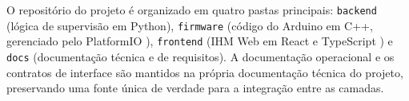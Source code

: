 O reposit\'orio do projeto \'e organizado em quatro pastas principais:
\texttt{backend} (l\'ogica de supervis\~ao em Python), \texttt{firmware}
(c\'odigo do Arduino em C++, gerenciado pelo PlatformIO \cite{platformio}),
\texttt{frontend} (IHM Web em React e TypeScript \cite{react}) e \texttt{docs}
(documenta\c{c}\~ao t\'ecnica e de requisitos). A documenta\c{c}\~ao operacional
e os contratos de interface s\~ao mantidos na pr\'opria documenta\c{c}\~ao
t\'ecnica do projeto, preservando uma fonte \'unica de verdade para a
integra\c{c}\~ao entre as camadas.
